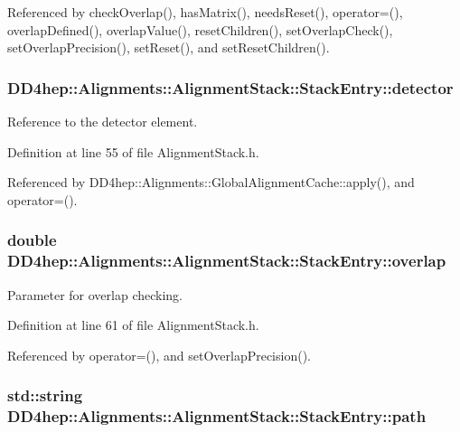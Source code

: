 Referenced by checkOverlap(), hasMatrix(), needsReset(), operator=(), overlapDefined(), overlapValue(), resetChildren(), setOverlapCheck(), setOverlapPrecision(), setReset(), and setResetChildren().\hypertarget{struct_d_d4hep_1_1_alignments_1_1_alignment_stack_1_1_stack_entry_aa74274273fd1aad6e46c77e9983b8e5c}{
\subsubsection[{detector}]{ {\bf DD4hep::Alignments::AlignmentStack::StackEntry::detector}}}
\label{struct_d_d4hep_1_1_alignments_1_1_alignment_stack_1_1_stack_entry_aa74274273fd1aad6e46c77e9983b8e5c}


Reference to the detector element. 

Definition at line 55 of file AlignmentStack.h.

Referenced by DD4hep::Alignments::GlobalAlignmentCache::apply(), and operator=().\hypertarget{struct_d_d4hep_1_1_alignments_1_1_alignment_stack_1_1_stack_entry_ad911a7daa4d606e7c8454b005064b4e9}{
\subsubsection[{overlap}]{\setlength{\rightskip}{0pt plus 5cm}double {\bf DD4hep::Alignments::AlignmentStack::StackEntry::overlap}}}
\label{struct_d_d4hep_1_1_alignments_1_1_alignment_stack_1_1_stack_entry_ad911a7daa4d606e7c8454b005064b4e9}


Parameter for overlap checking. 

Definition at line 61 of file AlignmentStack.h.

Referenced by operator=(), and setOverlapPrecision().\hypertarget{struct_d_d4hep_1_1_alignments_1_1_alignment_stack_1_1_stack_entry_a821c8882427c693062524b6573baa92c}{
\subsubsection[{path}]{\setlength{\rightskip}{0pt plus 5cm}std::string {\bf DD4hep::Alignments::AlignmentStack::StackEntry::path}}}
\label{struct_d_d4hep_1_1_alignments_1_1_alignment_stack_1_1_stack_entry_a821c8882427c693062524b6573baa92c}


